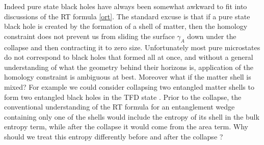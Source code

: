 \documentclass[12pt]{article}
\begin{document}
Indeed pure state black holes have always been somewhat awkward to fit into discussions of the RT formula \eqref{ort}.  The standard excuse is that if a pure state black hole is created by the formation of a shell of matter, then the homology constraint does not prevent us from sliding the surface $\gamma_A$ down under the collapse and then contracting it to zero size.  Unfortunately most pure microstates do not correspond to black holes that formed all at once, and without a general understanding of what the geometry behind their horizons is, application of the homology constraint is ambiguous at best.  Moreover what if the matter shell is mixed?  For example we could consider collapsing two entangled matter shells to form two entangled black holes in the TFD state \cite{Susskind:2014yaa}. Prior to the collapse, the conventional understanding of the RT formula for an entanglement wedge containing only one of the shells would include the entropy of its shell in the bulk entropy term, while after the collapse it would come from the area term.  Why should we treat this entropy differently before and after the collapse \cite{Susskind:2014yaa}?
\end{document}
